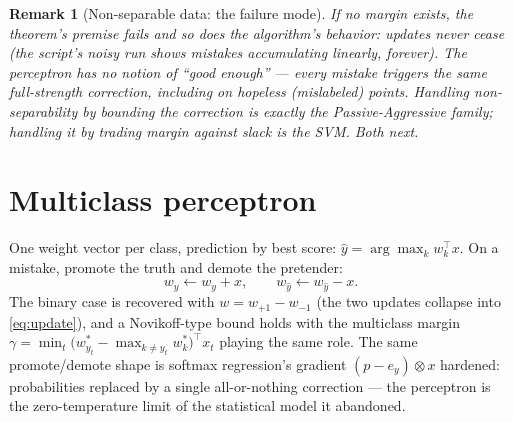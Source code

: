 \documentclass[11pt]{article}
\newtheorem{remark}{Remark}
\begin{document}
\begin{remark}[Non-separable data: the failure mode]
If no margin exists, the theorem's premise fails and so does the
algorithm's behavior: updates never cease (the script's noisy run shows
mistakes accumulating linearly, forever). The perceptron has no notion of
``good enough'' --- every mistake triggers the same full-strength
correction, including on hopeless (mislabeled) points. Handling
non-separability by \emph{bounding} the correction is exactly the
Passive-Aggressive family; handling it by \emph{trading} margin against
slack is the SVM. Both next.
\end{remark}

\section{Multiclass perceptron}

One weight vector per class, prediction by best score:
$\hat y = \arg\max_k w_k^\top x$. On a mistake, promote the truth and
demote the pretender:
\begin{equation}
  w_{y} \leftarrow w_{y} + x,
  \qquad
  w_{\hat y} \leftarrow w_{\hat y} - x .
  \label{eq:multiupdate}
\end{equation}
The binary case is recovered with $w = w_{+1} - w_{-1}$ (the two updates
collapse into \eqref{eq:update}), and a Novikoff-type bound holds with
the multiclass margin
$\gamma = \min_t \bigl(w^\ast_{y_t} - \max_{k\ne y_t} w^\ast_k\bigr)^\top
x_t$ playing the same role. The same promote/demote shape is softmax
regression's gradient $(p - e_y)\otimes x$ hardened: probabilities
replaced by a single all-or-nothing correction --- the perceptron is the
zero-temperature limit of the statistical model it abandoned.
\end{document}
